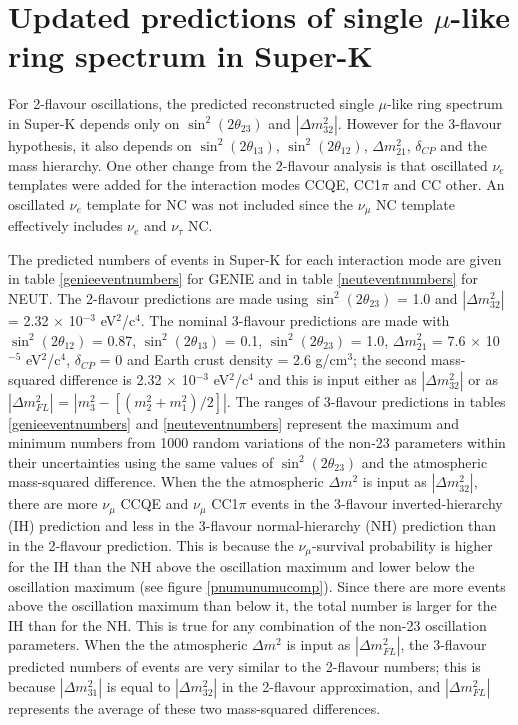 \clearpage

\section{Updated predictions of single $\mu$-like ring spectrum in Super-K}
\label{sec:pred}

For 2-flavour oscillations, the predicted reconstructed single $\mu$-like ring spectrum in Super-K depends only on 
$\sin^{2}(2 \theta_{23})$ and $|\Delta m_{32}^{2}|$. However for the 3-flavour hypothesis, it also depends on 
$\sin^{2}(2 \theta_{13})$, $\sin^{2}(2 \theta_{12})$, $\Delta m_{21}^{2}$, $\delta_{CP}$ and the mass hierarchy. 
One other change from the 2-flavour analysis is that oscillated $\nu_{e}$ templates were added for the interaction modes CCQE, CC1$\pi$ and 
CC other. An oscillated $\nu_{e}$ template for NC was not included since the $\nu_{\mu}$ NC template effectively includes $\nu_{e}$ and 
$\nu_{\tau}$ NC.
 
The predicted numbers of events in Super-K for each interaction mode are given in table \ref{genieeventnumbers} for GENIE and in table 
\ref{neuteventnumbers} for NEUT. The 2-flavour predictions are made using $\sin^{2}(2 \theta_{23})$ = 1.0 and $|\Delta m_{32}^{2}|$ = 2.32 $\times$ 10$^{-3}$ eV$^{2}$/c$^{4}$. 
The nominal 3-flavour predictions are made with $\sin^{2}(2 \theta_{12})$ = 0.87, $\sin^{2}(2 \theta_{13})$ = 0.1, $\sin^{2}(2 \theta_{23})$ = 1.0,
$\Delta m_{21}^{2}$ = 7.6 $\times$ 10$^{-5}$ eV$^{2}$/c$^{4}$, $\delta_{CP}$ = 0 and Earth crust density = 2.6 g/cm$^{3}$; the second mass-squared difference 
is 2.32 $\times$ 10$^{-3}$ eV$^{2}$/c$^{4}$ and this is input either as $|\Delta m_{32}^{2}|$ or as $|\Delta m_{FL}^{2}|$ = $|m_{3}^{2} - [(m_{2}^{2} + m_{1}^{2}) / 2]|$. 
The ranges of 3-flavour predictions in tables \ref{genieeventnumbers} and \ref{neuteventnumbers} represent the maximum and minimum numbers from 1000 random 
variations of the non-23 parameters within their uncertainties using the same values of $\sin^{2}(2 \theta_{23})$ and the atmospheric mass-squared difference. 
When the the atmospheric $\Delta m^{2}$ is input as $|\Delta m_{32}^{2}|$, there are more $\nu_{\mu}$ CCQE and 
$\nu_{\mu}$ CC1$\pi$ events in the 3-flavour inverted-hierarchy (IH) prediction and less in the 3-flavour normal-hierarchy (NH) prediction than in the 
2-flavour prediction. This is because the $\nu_{\mu}$-survival probability is higher for the IH than the NH above the oscillation maximum and lower below 
the oscillation maximum (see figure \ref{pnumunumucomp}). Since there are more events above the oscillation maximum than below it, the total number is 
larger for the IH than for the NH. This is true for any combination of the non-23 oscillation parameters. When the the atmospheric $\Delta m^{2}$ is 
input as $|\Delta m_{FL}^{2}|$, the 3-flavour predicted numbers of events are very similar to the 2-flavour numbers; this is because $|\Delta m_{31}^{2}|$ 
is equal to $|\Delta m_{32}^{2}|$ in the 2-flavour approximation, and $|\Delta m_{FL}^{2}|$ represents the average of these two mass-squared differences.


